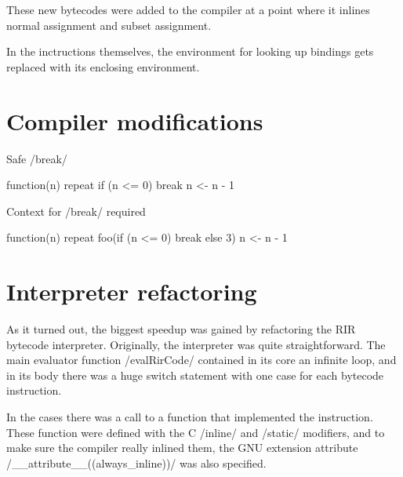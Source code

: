 These new bytecodes were added to the compiler at a point where it inlines normal assignment and subset assignment.

In the inctructions themselves, the environment for looking up bindings gets replaced with its enclosing environment.


\section{Compiler modifications}


\begin{listing}[htbp]
  \caption{\label{lst:local-break}Safe \rinline/break/}
  \begin{rcode}
function(n) {
    repeat {
        if (n <= 0) break
        n <- n - 1
    }
}
  \end{rcode}
\end{listing}

\begin{listing}[htbp]
  \caption{\label{lst:non-local-break}Context for \rinline/break/ required}
  \begin{rcode}
function(n) {
    repeat {
        foo(if (n <= 0) break else 3)
        n <- n - 1
    }
}
  \end{rcode}
\end{listing}


\section{Interpreter refactoring}

As it turned out, the biggest speedup was gained by refactoring the RIR bytecode interpreter. Originally, the interpreter was quite straightforward. The main evaluator function \cinline/evalRirCode/ contained in its core an infinite loop, and in its body there was a huge switch statement with one case for each bytecode instruction.

In the cases there was a call to a function that implemented the instruction. These function were defined with the C \cinline/inline/ and \cinline/static/ modifiers, and to make sure the compiler really inlined them, the GNU extension attribute \cinline/__attribute__((always_inline))/ was also specified.

